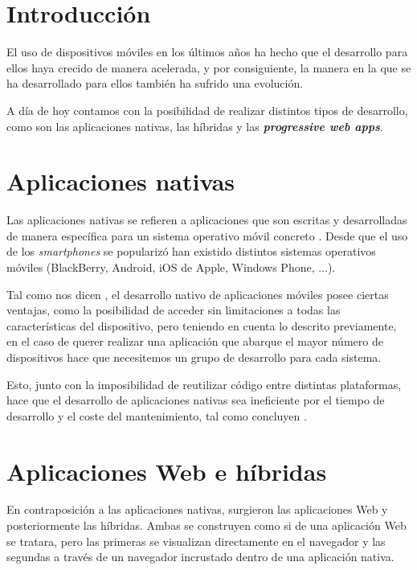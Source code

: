 \documentclass{\ClassPath/viu-tfm-template}
\begin{document}
    \graphicspath{{../VIU_TFM_LaTeX_template/}}

    \coverpage

    \tableofcontents

\chapter{Introducción}

El uso de dispositivos móviles en los últimos años ha hecho que el desarrollo para ellos haya crecido de manera acelerada, y por consiguiente, la manera en la que se ha desarrollado para ellos también ha sufrido una evolución.

A día de hoy contamos con la posibilidad de realizar distintos tipos de desarrollo, como son las aplicaciones nativas, las híbridas y las \textbf{\textit{progressive web apps}}.

\chapter{Aplicaciones nativas}

Las aplicaciones nativas se refieren a aplicaciones que son escritas y desarrolladas de manera específica para un sistema operativo móvil concreto \parencite{Jobe_2013}. Desde que el uso de los \textit{smartphones} se popularizó han existido distintos sistemas operativos móviles (BlackBerry, Android, iOS de Apple, Windows Phone, ...).

Tal como nos dicen \textcite{thomas_2020}, el desarrollo nativo de aplicaciones móviles posee ciertas ventajas, como la posibilidad de acceder sin limitaciones a todas las características del dispositivo, pero teniendo en cuenta lo descrito previamente, en el caso de querer realizar una aplicación que abarque el mayor número de dispositivos hace que necesitemos un grupo de desarrollo para cada sistema.

Esto, junto con la imposibilidad de reutilizar código entre distintas plataformas, hace que el desarrollo de aplicaciones nativas sea ineficiente por el tiempo de desarrollo y el coste del mantenimiento, tal como concluyen \textcite{xanthopoulos2013comparative}.


\chapter{Aplicaciones Web e híbridas}

En contraposición a las aplicaciones nativas, surgieron las aplicaciones Web y posteriormente las híbridas. Ambas se construyen como si de una aplicación Web se tratara, pero las primeras se visualizan directamente en el navegador y las segundas a través de un navegador incrustado dentro de una aplicación nativa.
\end{document}
